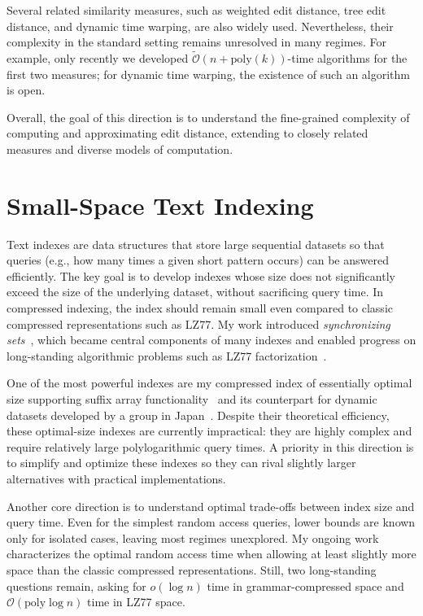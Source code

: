 \documentclass[a4paper,11pt]{article}
\newcommand{\Oh}{\mathcal{O}}
\newcommand{\Ohtilde}{\tilde{\mathcal{O}}}
\begin{document}
Several related similarity measures, such as weighted edit distance, tree edit distance, and dynamic time warping, are also widely used. 
Nevertheless, their complexity in the standard setting remains unresolved in many regimes. 
For example, only recently we developed $\Ohtilde(n+\mathrm{poly}(k))$-time algorithms for the first two measures; for dynamic time warping, the existence of such an algorithm is open.  

Overall, the goal of this direction is to understand the fine-grained complexity of computing and approximating edit distance, extending to closely related measures and diverse models of computation.

\section{Small-Space Text Indexing}

Text indexes are data structures that store large sequential datasets so that queries (e.g., how many times a given short pattern occurs) can be answered efficiently. 
The key goal is to develop indexes whose size does not significantly exceed the size of the underlying dataset, without sacrificing query time. 
In compressed indexing, the index should remain small even compared to classic compressed representations such as LZ77.  
My work introduced \emph{synchronizing sets}~\cite{KK19}, which became central components of many indexes and enabled progress on long-standing algorithmic problems such as LZ77 factorization~\cite{KK24}.  

One of the most powerful indexes are my compressed index of essentially optimal size supporting suffix array functionality~\cite{KK23} and its counterpart for dynamic datasets developed by a group in Japan~\cite{NT24}.  
Despite their theoretical efficiency, these optimal-size indexes are currently impractical: they are highly complex and require relatively large polylogarithmic query times. 
A priority in this direction is to simplify and optimize these indexes so they can rival slightly larger alternatives with practical implementations.  

Another core direction is to understand optimal trade-offs between index size and query time. 
Even for the simplest random access queries, lower bounds are known only for isolated cases, leaving most regimes unexplored. 
My ongoing work characterizes the optimal random access time when allowing at least slightly more space than the classic compressed representations. Still, two long-standing questions remain, asking for $o(\log n)$ time in grammar-compressed space and $\Oh(\mathrm{poly}\log n)$ time in LZ77 space.  
\end{document}
